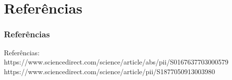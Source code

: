 \documentclass{beamer}
\begin{document}


\section{Referências}

\begin{frame}
\frametitle{Referências}
Referências:\\
https://www.sciencedirect.com/science/article/abs/pii/S0167637703000579
https://www.sciencedirect.com/science/article/pii/S1877050913003980
\end{frame}
\end{document}
